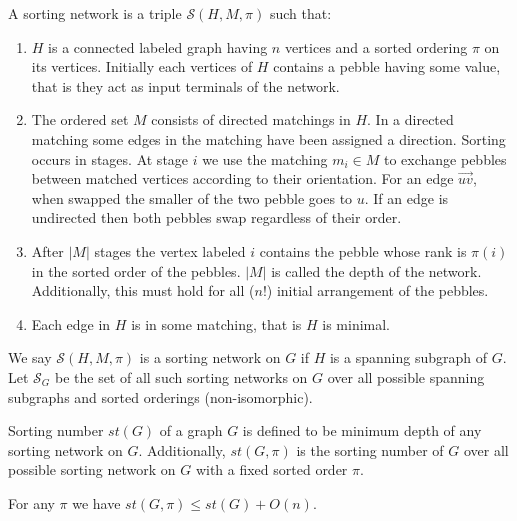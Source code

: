 \documentclass[runningheads,a4paper]{llncs}
\begin{document}
\begin{definition}
	A sorting network is a triple $\mathcal{S}(H,M,\pi)$ such that:
	\begin{enumerate}
		\item $H$ is a connected labeled graph having $n$ vertices and a sorted ordering $\pi$ on its vertices. Initially each vertices of $H$ contains a pebble having some value, that is they act as input terminals of the network.
		\item The ordered set $M$ consists of directed matchings in $H$. In a directed matching some edges in the matching have been assigned a direction. Sorting occurs in stages.
		At stage $i$ we use the matching $m_i \in M$ to exchange pebbles between matched vertices according to their orientation. For an edge $\overrightarrow{uv}$, when swapped the smaller of the two pebble goes to $u$. If an edge is undirected then both pebbles swap regardless of their order.
		\item After $|M|$ stages the vertex labeled $i$ contains the pebble whose rank is $\pi(i)$ in the sorted order of the pebbles.  $|M|$ is called the depth of the network. Additionally, this must hold for all ($n!$) initial arrangement of the pebbles.
		\item Each edge in $H$ is in some matching, that is $H$ is minimal. 
	\end{enumerate}
	
\end{definition}

\noindent We say  $\mathcal{S}(H,M,\pi)$ is a sorting network on $G$ if $H$ is a spanning subgraph of $G$. Let $\mathcal{S}_G$ be the set of all such sorting networks on $G$ over all possible spanning subgraphs and sorted orderings (non-isomorphic).


\begin{definition}
	Sorting number $st(G)$ of a graph $G$ is defined to be minimum depth of any sorting network on $G$. Additionally, $st(G,\pi)$ is the sorting number of $G$ over all possible sorting network on $G$ with a fixed sorted order $\pi$.
\end{definition}

\begin{lemma}
For any $\pi$ we have $st(G, \pi) \le st(G) + O(n)$.
\end{lemma}
\end{document}
